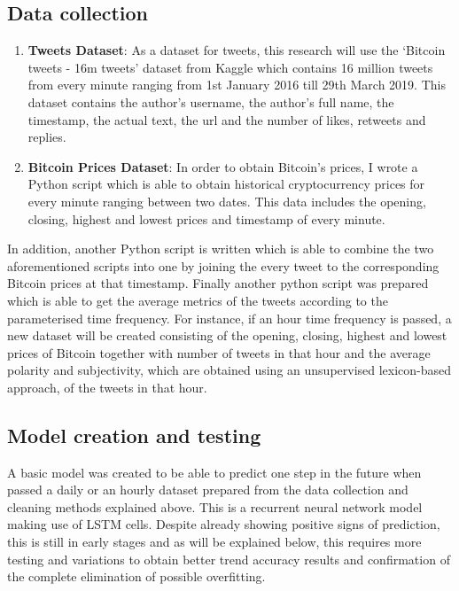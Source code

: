\documentclass{article}
\begin{document}
	\subsection{Data collection}
	
	\begin{enumerate}
	\item \textbf{Tweets Dataset}:
	As a dataset for tweets, this research will use the `Bitcoin tweets - 16m tweets' \cite{tweetsdata} dataset from Kaggle which contains 16 million tweets from every minute ranging from 1st January 2016 till 29th March 2019. This dataset contains the author's username, the author's full name, the timestamp, the actual text, the url and the number of likes, retweets and replies.  
	\item \textbf{Bitcoin Prices Dataset}:
	In order to obtain Bitcoin's prices, I wrote a Python script which is able to obtain historical cryptocurrency prices for every minute ranging between two dates. This data includes the opening, closing, highest and lowest prices and timestamp of every minute.
	
	\end{enumerate}
	
	In addition, another Python script is written which is able to combine the two aforementioned scripts into one by joining the every tweet to the corresponding Bitcoin prices at that timestamp. Finally another python script was prepared which is able to get the average metrics of the tweets according to the parameterised time frequency. For instance, if an hour time frequency is passed, a new dataset will be created consisting of the opening, closing, highest and lowest prices of Bitcoin together with number of tweets in that hour and the average polarity and subjectivity, which are obtained using an unsupervised lexicon-based approach, of the tweets in that hour.
	
	\subsection{Model creation and testing}
	
	A basic model was created to be able to predict one step in the future when passed a daily or an hourly dataset prepared from the data collection and cleaning methods explained above. This is a recurrent neural network model making use of LSTM cells. Despite already showing positive signs of prediction, this is still in early stages and as will be explained below, this requires more testing and variations to obtain better trend accuracy results and confirmation of the complete elimination of possible overfitting. 
	
\end{document}
